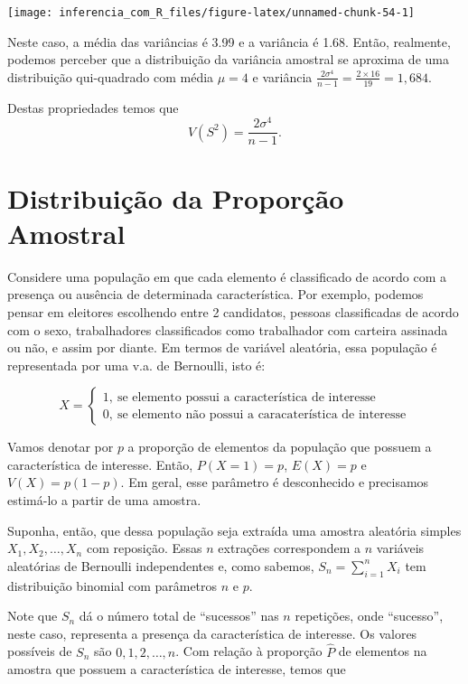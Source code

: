 \documentclass[
]{book}
\begin{document}
\begin{center}\texttt{[image: inferencia\_com\_R\_files/figure-latex/unnamed-chunk-54-1]} \end{center}

Neste caso, a média das variâncias é 3.99 e a variância é 1.68. Então, realmente, podemos perceber que a distribuição da variância amostral se aproxima de uma distribuição qui-quadrado com média \(\mu=4\) e variância \(\frac{2\sigma^4}{n-1}=\frac{2\times 16}{19}=1,684\).

Destas propriedades temos que \[V(S^2)=\frac{2\sigma^4}{n-1}.\]

\hypertarget{distribuiuxe7uxe3o-da-proporuxe7uxe3o-amostral}{%
\section{Distribuição da Proporção Amostral}\label{distribuiuxe7uxe3o-da-proporuxe7uxe3o-amostral}}

Considere uma população em que cada elemento é classificado de acordo com a presença ou ausência de determinada característica. Por exemplo, podemos pensar em eleitores escolhendo entre 2 candidatos, pessoas classificadas de acordo com o sexo, trabalhadores classificados como trabalhador com carteira assinada ou não, e assim por diante. Em termos de variável aleatória, essa população é representada por uma v.a. de Bernoulli, isto é:

\[
X=\begin{cases}
1,~\text{se elemento possui a característica de interesse}\\
0,~\text{se elemento não possui a caracaterística de interesse}
\end{cases}
\]

Vamos denotar por \(p\) a proporção de elementos da população que possuem a característica de interesse. Então, \(P(X = 1) = p\), \(E(X) = p\) e \(V(X) = p(1 -p)\). Em geral, esse parâmetro é desconhecido e precisamos estimá-lo a partir de uma amostra.

Suponha, então, que dessa população seja extraída uma amostra aleatória simples \(X_1, X_2, \ldots , X_n\) com reposição. Essas \(n\) extrações correspondem a \(n\) variáveis aleatórias de Bernoulli independentes e, como sabemos, \(S_n =\sum_{i=1}^n X_i\) tem distribuição binomial com parâmetros \(n\) e \(p\).

Note que \(S_n\) dá o número total de ``sucessos'' nas \(n\) repetições, onde ``sucesso'', neste caso, representa a presença da característica de interesse. Os valores possíveis de \(S_n\) são \(0, 1, 2,\ldots , n\). Com relação à proporção \(\hat P\) de elementos na amostra que possuem a característica de interesse, temos que
\end{document}
